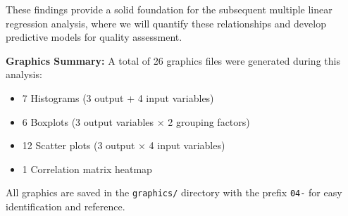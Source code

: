 These findings provide a solid foundation for the subsequent multiple linear regression analysis, where we will quantify these relationships and develop predictive models for quality assessment.

\textbf{Graphics Summary:}
A total of 26 graphics files were generated during this analysis:
\begin{itemize}
    \item 7 Histograms (3 output + 4 input variables)
    \item 6 Boxplots (3 output variables × 2 grouping factors)
    \item 12 Scatter plots (3 output × 4 input variables)
    \item 1 Correlation matrix heatmap
\end{itemize}

All graphics are saved in the \texttt{graphics/} directory with the prefix \texttt{04-} for easy identification and reference.